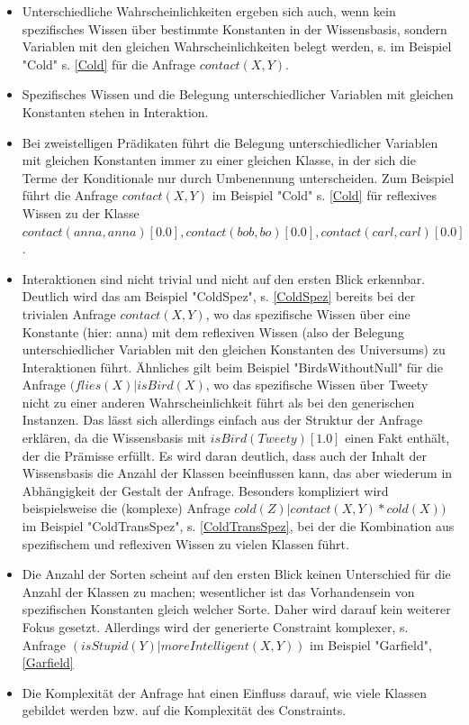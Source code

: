 \documentclass[a4paper, 11pt]{book}
\begin{document}
\begin{itemize}
		\item Unterschiedliche Wahrscheinlichkeiten ergeben sich auch, wenn kein spezifisches Wissen über bestimmte Konstanten in der Wissensbasis, sondern Variablen mit den gleichen Wahrscheinlichkeiten belegt werden, s.  im Beispiel "{}Cold"{} s. \ref{Cold} für die Anfrage $ contact(X,Y) $.
		\item Spezifisches Wissen und die Belegung unterschiedlicher Variablen mit gleichen Konstanten stehen in Interaktion.
		\item Bei zweistelligen Prädikaten führt die Belegung unterschiedlicher Variablen mit gleichen Konstanten immer zu einer gleichen Klasse, in der sich die Terme der Konditionale nur durch Umbenennung unterscheiden. Zum Beispiel führt die Anfrage $ contact(X,Y) $ im Beispiel "{}Cold"{} s. \ref{Cold} für reflexives Wissen zu der Klasse $ contact(anna,anna)[0.0], contact(bob,bo)[0.0] , contact(carl,carl)[0.0]  $.
		\item Interaktionen sind nicht trivial und nicht auf den ersten Blick erkennbar. Deutlich wird das am Beispiel "{}ColdSpez"{}, s. \ref{ColdSpez} bereits bei der trivialen Anfrage $ contact(X,Y) $, wo das spezifische Wissen über eine Konstante (hier: anna) mit dem reflexiven Wissen (also der Belegung unterschiedlicher Variablen mit den gleichen Konstanten des Universums) zu Interaktionen führt. Ähnliches gilt beim Beispiel "{}BirdsWithoutNull"{} für die Anfrage $ (flies(X) | isBird(X) $, wo das spezifische Wissen über Tweety nicht zu einer anderen Wahrscheinlichkeit führt als bei den generischen Instanzen. Das lässt sich allerdings einfach aus der Struktur der Anfrage erklären, da die Wissensbasis mit $ isBird(Tweety)[1.0] $ einen Fakt enthält, der die Prämisse erfüllt. Es wird daran deutlich, dass auch der Inhalt der Wissensbasis die Anzahl der Klassen beeinflussen kann, das aber wiederum in Abhängigkeit der Gestalt der Anfrage. Besonders kompliziert wird beispielsweise die (komplexe) Anfrage $ cold(Z)|contact(X,Y) * cold(X)) $ im Beispiel "{}ColdTransSpez"{}, s. \ref{ColdTransSpez}, bei der die Kombination aus spezifischem und reflexiven Wissen zu vielen Klassen führt.
		\item Die Anzahl der Sorten scheint auf den ersten Blick keinen Unterschied für die Anzahl der Klassen zu machen; wesentlicher ist das Vorhandensein von spezifischen Konstanten gleich welcher Sorte. Daher wird darauf kein weiterer Fokus gesetzt. Allerdings wird der generierte Constraint komplexer, s. Anfrage $ (isStupid(Y)|moreIntelligent(X,Y)) $ im Beispiel "{}Garfield"{}, \ref{Garfield}
		\item Die Komplexität der Anfrage hat einen Einfluss darauf, wie viele Klassen gebildet werden bzw. auf die Komplexität des Constraints. 	
 
	\end{itemize}
\end{document}
